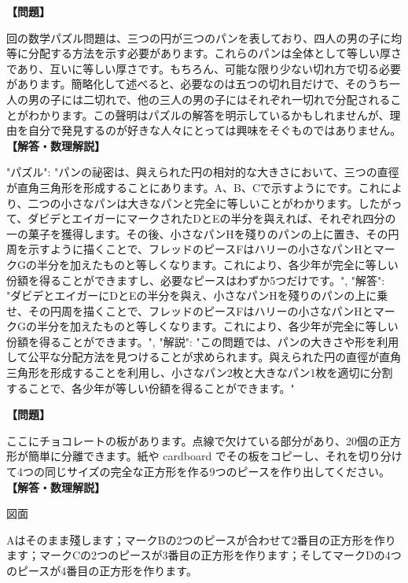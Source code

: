 \documentclass[10pt,a4paper,oneside,openany]{ltjsbook}
\begin{document}
\begin{tcolorbox}[colback=softblue,colframe=primaryblue,title=\textbf{第 148 問：THE BUN PUZZLE.},arc=2mm,boxrule=1pt,breakable]
\textbf{【問題】}\par\vspace{0.3em}
回の数学パズル問題は、三つの円が三つのパンを表しており、四人の男の子に均等に分配する方法を示す必要があります。これらのパンは全体として等しい厚さであり、互いに等しい厚さです。もちろん、可能な限り少ない切れ方で切る必要があります。簡略化して述べると、必要なのは五つの切れ目だけで、そのうち一人の男の子には二切れで、他の三人の男の子にはそれぞれ一切れで分配されることがわかります。この聲明はパズルの解答を明示しているかもしれませんが、理由を自分で発見するのが好きな人々にとっては興味をそぐものではありません。
\tcblower
\textbf{【解答・数理解説】}\par\vspace{0.3em}
{
  "パズル": "パンの祕密は、與えられた円の相対的な大きさにおいて、三つの直徑が直角三角形を形成することにあります。A、B、Cで示すようにです。これにより、二つの小さなパンは大きなパンと完全に等しいことがわかります。したがって、ダビデとエイガーにマークされたDとEの半分を與えれば、それぞれ四分の一の菓子を獲得します。その後、小さなパンHを殘りのパンの上に置き、その円周を示すように描くことで、フレッドのピースFはハリーの小さなパンHとマークGの半分を加えたものと等しくなります。これにより、各少年が完全に等しい份額を得ることができますし、必要なピースはわずか5つだけです。",
  "解答": "ダビデとエイガーにDとEの半分を與え、小さなパンHを殘りのパンの上に乗せ、その円周を描くことで、フレッドのピースFはハリーの小さなパンHとマークGの半分を加えたものと等しくなります。これにより、各少年が完全に等しい份額を得ることができます。",
  "解説": "この問題では、パンの大きさや形を利用して公平な分配方法を見つけることが求められます。與えられた円の直徑が直角三角形を形成することを利用し、小さなパン2枚と大きなパン1枚を適切に分割することで、各少年が等しい份額を得ることができます。"
}
\end{tcolorbox}

\begin{tcolorbox}[colback=softblue,colframe=primaryblue,title=\textbf{第 149 問：チョコレートの正方形 （原題: THE CHOCOLATE SQUARES.）},arc=2mm,boxrule=1pt,breakable]
\textbf{【問題】}\par\vspace{0.3em}
ここにチョコレートの板があります。点線で欠けている部分があり、20個の正方形が簡単に分離できます。紙や cardboard でその板をコピーし、それを切り分けて4つの同じサイズの完全な正方形を作る9つのピースを作り出してください。
\tcblower
\textbf{【解答・数理解説】}\par\vspace{0.3em}
図面

Aはそのまま殘します；マークBの2つのピースが合わせて2番目の正方形を作ります；マークCの2つのピースが3番目の正方形を作ります；そしてマークDの4つのピースが4番目の正方形を作ります。
\end{tcolorbox}
\end{document}
